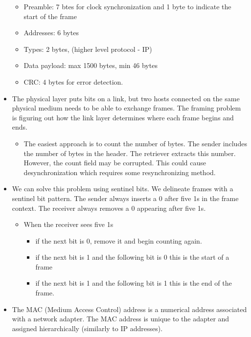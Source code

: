 \documentclass[]{article}
\providecommand{\tightlist}{%
  \setlength{\itemsep}{0pt}\setlength{\parskip}{0pt}}
\begin{document}
\begin{itemize}
  \begin{itemize}
  \tightlist
  \item
    Preamble: 7 btes for clock synchronization and 1 byte to indicate
    the start of the frame
  \item
    Addresses: 6 bytes
  \item
    Types: 2 bytes, (higher level protocol - IP)
  \item
    Data payload: max 1500 bytes, min 46 bytes
  \item
    CRC: 4 bytes for error detection.
  \end{itemize}
\item
  The physical layer puts bits on a link, but two hosts connected on the
  same physical medium needs to be able to exchange frames. The framing
  problem is figuring out how the link layer determines where each frame
  begins and ends.

  \begin{itemize}
  \tightlist
  \item
    The easiest approach is to count the number of bytes. The sender
    includes the number of bytes in the header. The retriever extracts
    this number. However, the count field may be corrupted. This could
    cause desynchronization which requires some resynchronizing method.
  \end{itemize}
\item
  We can solve this problem using sentinel bits. We delineate frames
  with a sentinel bit pattern. The sender always inserts a 0 after five
  1s in the frame context. The receiver always removes a 0 appearing
  after five 1s.

  \begin{itemize}
  \tightlist
  \item
    When the receiver sees five 1s

    \begin{itemize}
    \tightlist
    \item
      if the next bit is 0, remove it and begin counting again.
    \item
      if the next bit is 1 and the following bit is 0 this is the start
      of a frame
    \item
      if the next bit is 1 and the following bit is 1 this is the end of
      the frame.
    \end{itemize}
  \end{itemize}
\item
  The MAC (Medium Access Control) address is a numerical address
  associated with a network adapter. The MAC address is unique to the
  adapter and assigned hierarchically (similarly to IP addresses).


\end{itemize}
\end{document}
